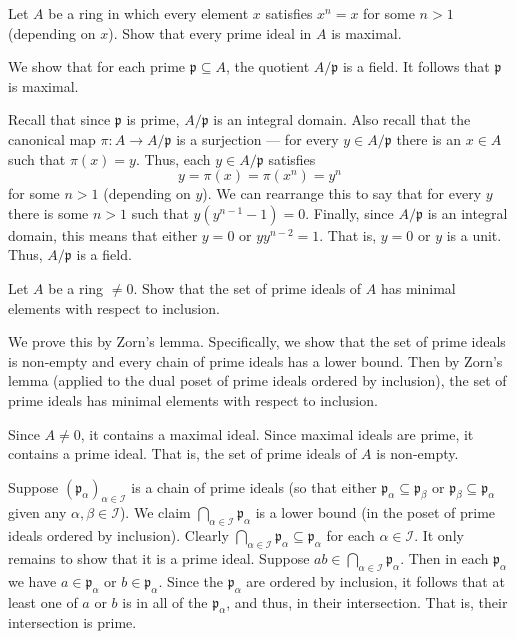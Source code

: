 \documentclass[12 pt, letterpaper]{hmcpset}
\begin{document}
\pagebreak

\begin{problem}[A \& M Ch. 1 \#7.]
	Let $A$ be a ring in which every element $x$ satisfies $x^{n} = x$ for some $n > 1$ (depending on $x$). Show that every prime ideal in $A$ is maximal.
\end{problem}

\begin{solution}
	We show that for each prime $\mathfrak{p} \subseteq A$, the quotient $A / \mathfrak{p}$ is a field. It follows that $\mathfrak{p}$ is maximal.

	Recall that since $\mathfrak{p}$ is prime, $A / \mathfrak{p}$ is an integral domain. Also recall that the canonical map $\pi : A \to A / \mathfrak{p}$ is a surjection --- for every $y \in A / \mathfrak{p}$ there is an $x \in A$ such that $\pi(x) = y$. Thus, each $y \in A / \mathfrak{p}$ satisfies
	\[
		y = \pi(x) = \pi(x^{n}) = y^{n}
	\]
	for some $n > 1$ (depending on $y$). We can rearrange this to say that for every $y$ there is some $n > 1$ such that $y(y^{n - 1} - 1) = 0$. Finally, since $A / \mathfrak{p}$ is an integral domain, this means that either  $y = 0$ or $y y^{n - 2} = 1$. That is, $y = 0$ or $y$ is a unit. Thus, $A / \mathfrak{p}$ is a field.
\end{solution}	

\pagebreak

\begin{problem}[A \& M Ch. 1 \#8.]
	Let $A$ be a ring $\neq 0$. Show that the set of prime ideals of $A$ has minimal elements with respect to inclusion.
\end{problem}

\begin{solution}
	We prove this by Zorn's lemma. Specifically, we show that the set of prime ideals is non-empty and every chain of prime ideals has a lower bound. Then by Zorn's lemma (applied to the dual poset of prime ideals ordered by inclusion), the set of prime ideals has minimal elements with respect to inclusion.

	Since $A \neq 0$, it contains a maximal ideal. Since maximal ideals are prime, it contains a prime ideal. That is, the set of prime ideals of $A$ is non-empty.

	Suppose $(\mathfrak{p}_{\alpha})_{\alpha \in \mathcal{I}}$ is a chain of prime ideals (so that either $\mathfrak{p}_{\alpha} \subseteq \mathfrak{p}_{\beta}$ or $\mathfrak{p}_{\beta} \subseteq \mathfrak{p}_{\alpha}$ given any $\alpha, \beta \in \mathcal{I}$). We claim $\bigcap_{\alpha \in \mathcal{I}} \mathfrak{p}_{\alpha}$ is a lower bound (in the poset of prime ideals ordered by inclusion). Clearly $\bigcap_{\alpha \in \mathcal{I}} \mathfrak{p}_{\alpha} \subseteq \mathfrak{p}_{\alpha}$ for each $\alpha \in \mathcal{I}$. It only remains to show that it is a prime ideal. Suppose $ab \in \bigcap_{\alpha \in \mathcal{I}} \mathfrak{p}_{\alpha}$. Then in each $\mathfrak{p}_{\alpha}$ we have $a \in \mathfrak{p}_{\alpha}$ or $b \in \mathfrak{p}_{\alpha}$. Since the $\mathfrak{p}_{\alpha}$ are ordered by inclusion, it follows that at least one of $a$ or $b$ is in all of the $\mathfrak{p}_{\alpha}$, and thus, in their intersection. That is, their intersection is prime.
\end{solution}
\end{document}
